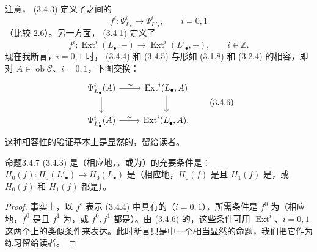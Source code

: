 注意， (3.4.3) 定义了之间的
\[
f^i:\Psi^i_{L_\bullet}\longrightarrow\Psi^i_{L'_\bullet},\qquad i=0,1\tag{3.4.4}
\]
（比较 2.6）。另一方面， (3.4.1) 定义了
\[
f^i:\operatorname{Ext}^i(L_\bullet,-)\longrightarrow\operatorname{Ext}^i(L'_\bullet,-),\qquad i\in\mathbb Z.\tag{3.4.5}
\]
现在我断言，$i=0,1$ 时， (3.4.4) 和 (3.4.5) 与形如 (3.1.8) 和 (3.2.4) 的相容，即对 $A\in\operatorname{ob}\mathcal C$、$i=0,1$，下图交换：
\[
\begin{tikzcd}
\Psi^i_{L_\bullet}(A)\arrow[r,"\sim"]\arrow[d]&\operatorname{Ext}^i(L_\bullet,A)\arrow[d]\\
\Psi^i_{L'_\bullet}(A)\arrow[r,"\sim"]&\operatorname{Ext}^i(L'_\bullet,A).
\end{tikzcd}\tag{3.4.6}
\]
这种相容性的验证基本上是显然的，留给读者。

\begin{SGAresult}{命题}{3.4.7}
 (3.4.3) 是（相应地，，或为）的充要条件是：$H_0(f):H_0(L'_\bullet)\to H_0(L_\bullet)$ 是（相应地，$H_0(f)$ 是且 $H_1(f)$ 是，或 $H_0(f)$ 和 $H_1(f)$ 都是）。
\end{SGAresult}
\begin{proof}
事实上，以 $f^i$ 表示 (3.4.4) 中具有的（$i=0,1$），所需条件是 $f^0$ 为（相应地，$f^0$ 是且 $f^1$ 为，或 $f^0,f^1$ 都是）。由 (3.4.6) 的，这些条件可用 $\operatorname{Ext}^i$、$i=0,1$ 这两个上的类似条件来表达。此时断言只是中一个相当显然的命题，我们把它作为练习留给读者。
\end{proof}

